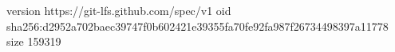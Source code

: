 version https://git-lfs.github.com/spec/v1
oid sha256:d2952a702baec39747f0b602421e39355fa70fe92fa987f26734498397a11778
size 159319
